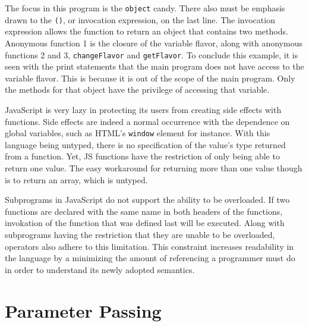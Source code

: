 \documentclass[man]{apa}
\begin{document}


The focus in this program is the \texttt{object} candy. There also must be emphasis drawn to the \texttt{()}, or invocation expression, on the last line. The invocation expression allows the function to return an object that contains two methods. Anonymous function 1 is the closure of the variable flavor, along with anonymous functions 2 and 3, \texttt{changeFlavor} and \texttt{getFlavor}. To conclude this example, it is seen with the print statements that the main program does not have access to the variable flavor. This is because it is out of the scope of the main program. Only the methods for that object have the privilege of accessing that variable.

JavaScript is very lazy in protecting its users from creating side effects with functions. Side effects are indeed a normal occurrence with the dependence on global variables, such as HTML's \texttt{window} element for instance. With this language being untyped, there is no specification of the value's type returned from a function. Yet, JS functions have the restriction of only being able to return one value. The easy workaround for returning more than one value though is to return an array, which is untyped.

Subprograms in JavaScript do not support the ability to be overloaded. If two functions are declared with the same name in both headers of the functions, invokation of the function that was defined last will be executed. Along with subprograms having the restriction that they are unable to be overloaded, operators also adhere to this limitation. This constraint increases readability in the language by a minimizing the amount of referencing a programmer must do in order to understand its newly adopted semantics.


\section{Parameter Passing}
\end{document}
